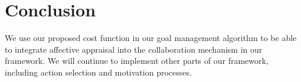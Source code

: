 \documentclass[conference]{IEEEtran}
\begin{document}
%



\section{Conclusion}

We use our proposed cost function in our goal management algorithm to be able to
integrate affective appraisal into the collaboration mechanism in our framework.
We will continue to implement other parts of our framework, including action
selection and motivation processes.


\end{document}

